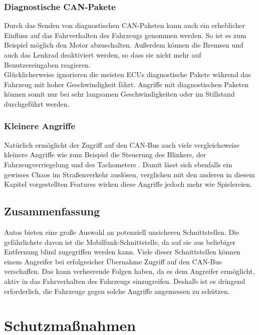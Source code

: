 \subsection{Diagnostische CAN-Pakete}
Durch das Senden von diagnostischen \acs{CAN}-Paketen kann auch ein erheblicher Einfluss auf das Fahrverhalten des Fahrzeugs genommen werden. So ist es zum Beispiel möglich den Motor abzuschalten. Außerdem können die Bremsen und auch das Lenkrad deaktiviert werden, so dass sie nicht mehr auf Benutzereingaben reagieren. \\
Glücklicherweise ignorieren die meisten \acsp{ECU} diagnostische Pakete während das Fahrzeug mit hoher Geschwindigkeit fährt. Angriffe mit diagnostischen Paketen können somit nur bei sehr langsamen Geschwindigkeiten oder im Stillstand durchgeführt werden.

\subsection{Kleinere Angriffe}
Natürlich ermöglicht der Zugriff auf den \acs{CAN}-Bus auch viele vergleichsweise kleinere Angriffe wie zum Beispiel die Steuerung des Blinkers, der Fahrzeugverriegelung und des Tachometers \cite[84]{Miller.2015}. Damit lässt sich ebenfalls ein gewisses Chaos im Straßenverkehr auslösen, verglichen mit den anderen in diesem Kapitel vorgestellten Features wirken diese Angriffe jedoch mehr wie Spielereien.


\section{Zusammenfassung}
Autos bieten eine große Auswahl an potenziell unsicheren Schnittstellen. Die gefährlichste davon ist die Mobilfunk-Schnittstelle, da auf sie aus beliebiger Entfernung blind zugegriffen werden kann. Viele dieser Schnittstellen können einem Angreifer bei erfolgreicher Übernahme Zugriff auf den \acs{CAN}-Bus verschaffen. Das kann verheerende Folgen haben, da es dem Angreifer ermöglicht, aktiv in das Fahrverhalten des Fahrzeugs einzugreifen. Deshalb ist es dringend erforderlich, die Fahrzeuge gegen solche Angriffe angemessen zu schützen.




\chapter{Schutzmaßnahmen}

